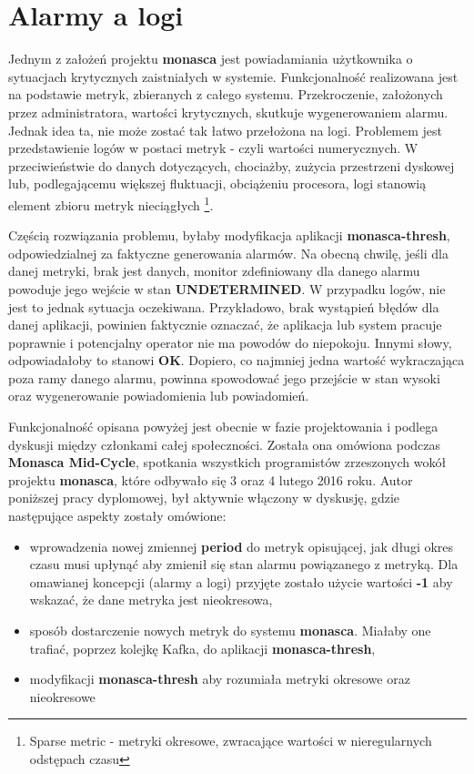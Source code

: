 \section{Alarmy a logi}
\label{chapter:application_own:plans:alarm_on_logs}

Jednym z założeń projektu \textbf{monasca} jest powiadamiania użytkownika o 
sytuacjach krytycznych zaistniałych w systemie. Funkcjonalność realizowana jest na podstawie
metryk, zbieranych z całego systemu. Przekroczenie, założonych przez administratora, wartości
krytycznych, skutkuje wygenerowaniem alarmu. Jednak idea ta, nie może zostać
tak łatwo przełożona na logi. Problemem jest przedstawienie logów w postaci metryk - czyli wartości
numerycznych. W przeciwieństwie do danych dotyczących, chociażby, zużycia przestrzeni dyskowej lub, podlegającemu większej
fluktuacji, obciążeniu procesora, logi stanowią element zbioru metryk nieciągłych \footnote{Sparse metric - metryki okresowe,
zwracające wartości w nieregularnych odstępach czasu}. 

Częścią rozwiązania problemu, byłaby modyfikacja aplikacji \textbf{monasca-thresh}, odpowiedzialnej za faktyczne generowania 
alarmów. Na obecną chwilę, jeśli dla danej metryki, brak jest danych, monitor zdefiniowany dla danego alarmu powoduje jego 
wejście w stan \textbf{UNDETERMINED}. W przypadku logów, nie jest to jednak sytuacja oczekiwana. Przykładowo, brak wystąpień 
błędów dla danej aplikacji, powinien faktycznie oznaczać, że aplikacja lub system pracuje poprawnie i potencjalny operator nie 
ma powodów do niepokoju. Innymi słowy, odpowiadałoby to stanowi \textbf{OK}. Dopiero, co najmniej jedna wartość wykraczająca 
poza ramy danego alarmu, powinna spowodować jego przejście w stan wysoki oraz wygenerowanie powiadomienia lub powiadomień.

Funkcjonalność opisana powyżej jest obecnie w fazie projektowania i podlega dyskusji między członkami całej społeczności.
Została ona omówiona podczas \textbf{Monasca Mid-Cycle}, spotkania wszystkich programistów zrzeszonych wokół projektu
\textbf{monasca}, które odbywało się 3 oraz 4 lutego 2016 roku. Autor poniższej pracy dyplomowej, był aktywnie włączony
w dyskusję, gdzie następujące aspekty zostały omówione:
\begin{itemize}
    \item wprowadzenia nowej zmiennej \textbf{period} do metryk opisującej, jak długi okres czasu musi upłynąć aby
    zmienił się stan alarmu powiązanego z metryką. Dla omawianej koncepcji (alarmy a logi) przyjęte zostało użycie wartości
    \textbf{-1} aby wskazać, że dane metryka jest nieokresowa,
    \item sposób dostarczenie nowych metryk do systemu \textbf{monasca}. Miałaby one trafiać, poprzez kolejkę Kafka,
    do aplikacji \textbf{monasca-thresh},
    \item modyfikacji \textbf{monasca-thresh} aby rozumiała metryki okresowe oraz nieokresowe
\end{itemize}